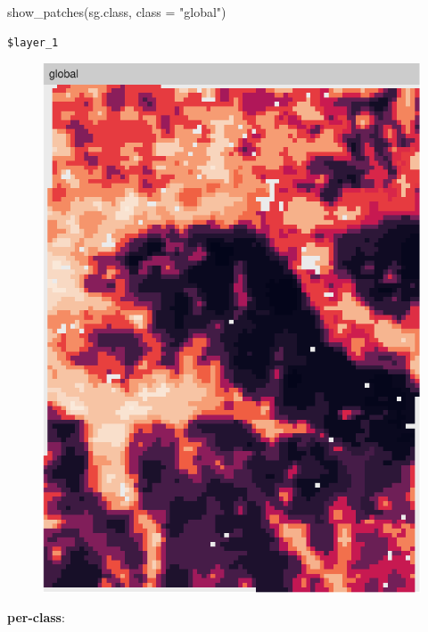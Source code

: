 \documentclass[
  letterpaper,
  DIV=11,
  numbers=noendperiod]{scrartcl}
\newenvironment{Shaded}{\begin{snugshade}}{\end{snugshade}}
\newcommand{\AttributeTok}[1]{\textcolor[rgb]{0.40,0.45,0.13}{#1}}
\newcommand{\FunctionTok}[1]{\textcolor[rgb]{0.28,0.35,0.67}{#1}}
\newcommand{\NormalTok}[1]{\textcolor[rgb]{0.00,0.23,0.31}{#1}}
\newcommand{\StringTok}[1]{\textcolor[rgb]{0.13,0.47,0.30}{#1}}
\begin{document}
\begin{Shaded}
\begin{Highlighting}[]
\FunctionTok{show\_patches}\NormalTok{(sg.class, }\AttributeTok{class =} \StringTok{"global"}\NormalTok{)}
\end{Highlighting}
\end{Shaded}

\begin{verbatim}
$layer_1
\end{verbatim}

\begin{figure}[H]

{\centering \includegraphics{PatternAnalysisWorkshopTutorial_files/figure-pdf/show.patches.global-2.pdf}

}

\end{figure}

\textbf{per-class}:
\end{document}
